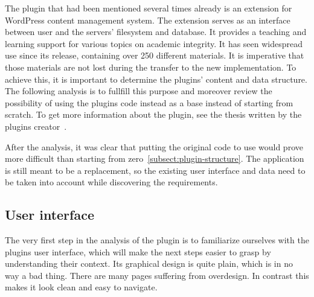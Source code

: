 \documentclass[
  digital,     %
  oneside,     %
  nosansbold,  %
  colorbold, %
  lof,         %
  lot,         %
]{fithesis4}
\begin{document}
The plugin that had been mentioned several times already is an extension for WordPress content management system. The extension serves as  an interface between user and the servers' filesystem and database. It provides a teaching and learning support for various topics on academic integrity. It has seen widespread use since its release, containing over 250 different materials. It is imperative that those materials are not lost during the transfer to the new implementation. To achieve this, it is important to determine the plugins' content and data structure. The following analysis is to fullfill this purpose and moreover review the possibility of using the plugins code instead as a base instead of starting from scratch. To get more  information about the plugin, see the thesis written by the plugins creator~\cite{lang18}.

After the analysis, it was clear that putting the original code to use would prove more difficult than starting from zero~\ref{subsect:plugin-structure}. The application is still meant to be a replacement, so the existing user interface and data need to be taken into account while discovering the requirements. 

\subsection{User interface}
\label{subsect:plugin-ui}

The very first step in the analysis of  the plugin is to familiarize ourselves with the plugins user interface, which will make the next steps easier to grasp by understanding their context. Its graphical design is quite plain, which is in no way a bad thing. There are many pages suffering from overdesign. In contrast this makes it look clean and easy to navigate.
\end{document}
